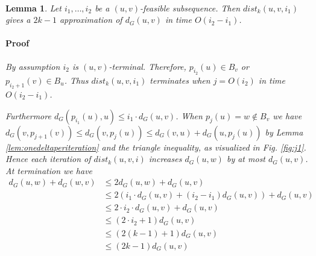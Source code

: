 \documentclass[12pt]{article}
\newtheorem{lem}[thm]{Lemma}
\begin{document}
\\
\begin{lem}
Let $i_1, \hdots, i_2$ be a $(u,v)$-feasible subsequence. Then $dist_k(u,v,i_1)$ gives a $2k-1$ approximation of $d_G(u,v)$ in time $O(i_2-i_1)$.
\paragraph{Proof} By assumption $i_2$ is $(u,v)$-terminal. Therefore, $p_{i_2}(u) \in B_v$ or $p_{i_2 + 1}(v) \in B_u$. Thus $dist_k(u,v,i_1)$ terminates when $j=O(i_2)$ in time $O(i_2-i_1)$.

Furthermore $d_{G}(p_{i_1}(u),u) \leq i_1 \cdot d_G(u,v)$. When $p_j(u) = w \not\in B_v$
we have $d_G(v,p_{j+1}(v)) \leq d_G(v,p_{j}(u)) \leq d_G(v,u) + d_G(u,p_j(u))$ by Lemma \ref{lem:onedeltaperiteration} and the triangle inequality, as visualized in Fig. \ref{fig:j1}. Hence each iteration of $dist_k(u,v,i)$ increases $d_G(u,w)$ by at most $d_G(u,v)$. At termination we have
\begin{align*}
d_G(u,w) + d_G(w,v) &\leq 2d_G(u,w) + d_G(u,v) \\
&\leq 2(i_1 \cdot d_G(u,v) + (i_2 - i_1)d_G(u,v)) + d_G(u,v) \\
&\leq 2 \cdot i_2 \cdot d_G(u,v) + d_G(u,v) \\
&\leq (2 \cdot i_2 + 1)d_G(u,v) \\
&\leq (2 (k-1) + 1)d_G(u,v) \\
&\leq (2k-1) d_G(u,v)
\end{align*}
\label{lem:uvfeasterminates}
\end{lem}
\end{document}
